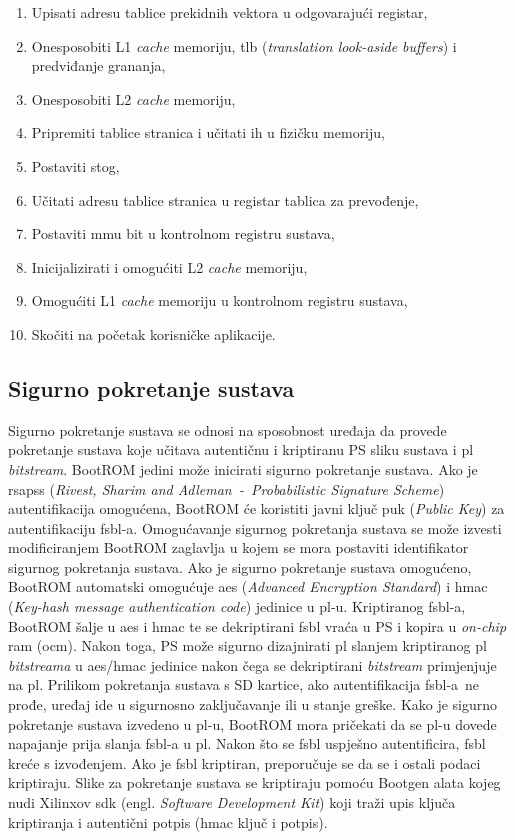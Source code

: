 \documentclass[times, utf8, diplomski, numeric]{fer}
\begin{document}
\begin{enumerate}
  \item{Upisati adresu tablice prekidnih vektora u odgovarajući registar,}
  \item{Onesposobiti L1 \textit{cache} memoriju, \gls{tlb} (\textit{translation look-aside buffers}) i predviđanje grananja,}
  \item{Onesposobiti L2 \textit{cache} memoriju,}
  \item{Pripremiti tablice stranica i učitati ih u fizičku memoriju,}
  \item{Postaviti stog,}
  \item{Učitati adresu tablice stranica u registar tablica za prevođenje,}
  \item{Postaviti \gls{mmu} bit u kontrolnom registru sustava,}
  \item{Inicijalizirati i omogućiti L2 \textit{cache} memoriju,}
  \item{Omogućiti L1 \textit{cache} memoriju u kontrolnom registru sustava,}
  \item{Skočiti na početak korisničke aplikacije.}
\end{enumerate}

\subsection{Sigurno pokretanje sustava}
Sigurno pokretanje sustava se odnosi na sposobnost uređaja da provede pokretanje sustava koje učitava autentičnu i
kriptiranu PS sliku sustava i \gls{pl} \textit{bitstream}. BootROM jedini može inicirati sigurno pokretanje sustava.
Ako je \gls{rsapss} (\textit{Rivest, Sharim and Adleman~-~Probabilistic Signature Scheme}) autentifikacija  omogućena,
BootROM će koristiti javni ključ \gls{puk} (\textit{Public Key}) za autentifikaciju \gls{fsbl}-a. Omogućavanje sigurnog
pokretanja sustava se može izvesti modificiranjem BootROM zaglavlja u kojem se mora postaviti identifikator sigurnog
pokretanja sustava. Ako je sigurno pokretanje sustava omogućeno, BootROM automatski omogućuje \gls{aes} (\textit{Advanced
Encryption Standard}) i \gls{hmac} (\textit{Key-hash message authentication code}) jedinice u \gls{pl}-u. Kriptiranog \gls{fsbl}-a, BootROM
šalje u \gls{aes} i \gls{hmac} te se dekriptirani \gls{fsbl} vraća u PS i kopira u \textit{on-chip} \gls{ram} (\gls{ocm}). Nakon toga, PS može sigurno
dizajnirati \gls{pl} slanjem kriptiranog \gls{pl} \textit{bitstreama} u \gls{aes}/\gls{hmac} jedinice nakon čega se dekriptirani
\textit{bitstream} primjenjuje na \gls{pl}.
Prilikom pokretanja sustava s SD kartice, ako autentifikacija \gls{fsbl}-a~ne prođe, uređaj ide u sigurnosno zaključavanje
ili u stanje greške. Kako je sigurno pokretanje sustava izvedeno u \gls{pl}-u, BootROM mora pričekati da se \gls{pl}-u dovede napajanje
prija slanja \gls{fsbl}-a u \gls{pl}. Nakon što se \gls{fsbl} uspješno autentificira, \gls{fsbl} kreće s izvođenjem. Ako je \gls{fsbl} kriptiran,
preporučuje se da se i ostali podaci kriptiraju. Slike za pokretanje sustava se kriptiraju pomoću Bootgen alata kojeg nudi
Xilinxov \gls{sdk} (engl. \textit{Software Development Kit}) koji traži upis ključa kriptiranja i autentični potpis (\gls{hmac} ključ i
potpis).
\end{document}

